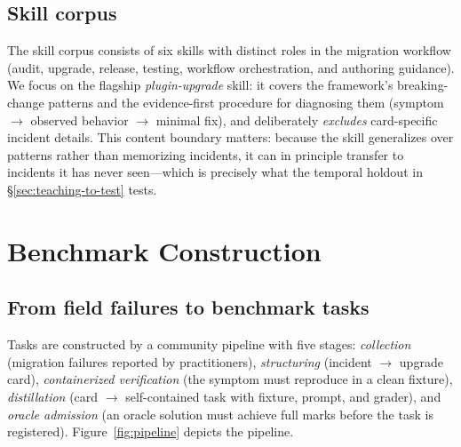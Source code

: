 \documentclass[11pt]{article}
\begin{document}
\begin{table}[t]
\centering
{}
\caption{An example upgrade card. Cards are practitioner-contributed, container-verified, and serve as the single ground truth for both skill distillation and task construction.}
\label{tab:card}
\end{table}

\subsection{Skill corpus}
\label{sec:corpus}

The skill corpus consists of six skills with distinct roles in the migration workflow (audit, upgrade, release, testing, workflow orchestration, and authoring guidance).
We focus on the flagship \emph{plugin-upgrade} skill: it covers the framework's breaking-change patterns and the evidence-first procedure for diagnosing them (symptom $\rightarrow$ observed behavior $\rightarrow$ minimal fix), and deliberately \emph{excludes} card-specific incident details.
This content boundary matters: because the skill generalizes over patterns rather than memorizing incidents, it can in principle transfer to incidents it has never seen---which is precisely what the temporal holdout in \S\ref{sec:teaching-to-test} tests.

\section{Benchmark Construction}
\label{sec:construction}

\subsection{From field failures to benchmark tasks}
\label{sec:pipeline}

Tasks are constructed by a community pipeline with five stages: \emph{collection} (migration failures reported by practitioners), \emph{structuring} (incident $\rightarrow$ upgrade card), \emph{containerized verification} (the symptom must reproduce in a clean fixture), \emph{distillation} (card $\rightarrow$ self-contained task with fixture, prompt, and grader), and \emph{oracle admission} (an oracle solution must achieve full marks before the task is registered).
Figure~\ref{fig:pipeline} depicts the pipeline.
\end{document}
